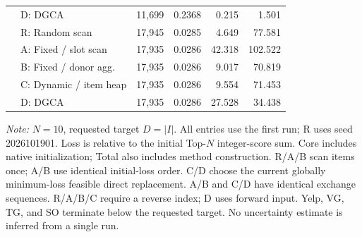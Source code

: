 \begin{table}[t]
\begin{tabular*}{\textwidth}{@{\extracolsep{\fill}}llrrrr@{}}
 & D: DGCA & 11,699 & 0.2368 & 0.215 & 1.501 \\
\addlinespace[4pt]
\multirow{5}{*}{SO} & R: Random scan & 17,945 & 0.0285 & 4.649 & 77.581 \\
 & A: Fixed / slot scan & 17,935 & 0.0286 & 42.318 & 102.522 \\
 & B: Fixed / donor agg. & 17,935 & 0.0286 & 9.017 & 70.819 \\
 & C: Dynamic / item heap & 17,935 & 0.0286 & 9.554 & 71.453 \\
 & D: DGCA & 17,935 & 0.0286 & 27.528 & 34.438 \\
\bottomrule
\end{tabular*}
\par\smallskip
\begin{minipage}{.98\textwidth}\footnotesize
\textit{Note:} $N=10$, requested target $D=|I|$. All entries use the first run; R uses seed 2026101901. Loss is relative to the initial Top-$N$ integer-score sum. Core includes native initialization; Total also includes method construction. R/A/B scan items once; A/B use identical initial-loss order. C/D choose the current globally minimum-loss feasible direct replacement. A/B and C/D have identical exchange sequences. R/A/B/C require a reverse index; D uses forward input. Yelp, VG, TG, and SO terminate below the requested target. No uncertainty estimate is inferred from a single run.
\end{minipage}
\end{table}
